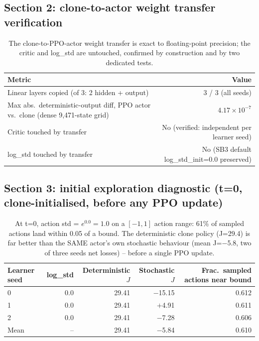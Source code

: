 
\subsection*{Section 2: clone-to-actor weight transfer verification}
\begin{table}[h]
\centering
\begin{tabular}{lr}
\hline
Metric & Value \\
\hline
Linear layers copied (of 3: 2 hidden + output) & 3 / 3 (all seeds) \\
Max abs.\ deterministic-output diff, PPO actor vs.\ clone (dense 9,471-state grid) & $4.17\times10^{-7}$ \\
Critic touched by transfer & No (verified: independent per learner seed) \\
log\_std touched by transfer & No (SB3 default log\_std\_init=0.0 preserved) \\
\hline
\end{tabular}
\caption{The clone-to-PPO-actor weight transfer is exact to floating-point
precision; the critic and log\_std are untouched, confirmed by construction
and by two dedicated tests.}
\end{table}

\subsection*{Section 3: initial exploration diagnostic (t=0, clone-initialised, before any PPO update)}
\begin{table}[h]
\centering
\begin{tabular}{lrrrr}
\hline
Learner seed & log\_std & Deterministic $J$ & Stochastic $J$ & Frac.\ sampled actions near bound \\
\hline
0 & 0.0 & 29.41 & $-$15.15 & 0.612 \\
1 & 0.0 & 29.41 & $+$4.91  & 0.611 \\
2 & 0.0 & 29.41 & $-$7.28  & 0.606 \\
\hline
Mean & -- & 29.41 & $-$5.84 & 0.610 \\
\hline
\end{tabular}
\caption{At t=0, action std = $e^{0.0}=1.0$ on a $[-1,1]$ action range: 61\% of
sampled actions land within 0.05 of a bound. The deterministic clone policy
(J=29.4) is far better than the SAME actor's own stochastic behaviour
(mean J=$-$5.8, two of three seeds net losses) -- before a single PPO update.}
\end{table}

